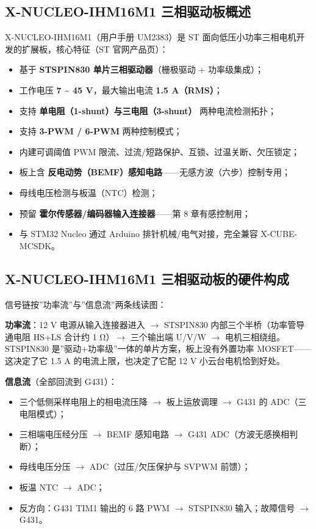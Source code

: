 \documentclass[
  UTF8,
  scheme=plain,
  fontsize=10pt,
  openany
]{ctexbook}
\begin{document}
\subsection{X-NUCLEO-IHM16M1
三相驱动板概述}\label{x-nucleo-ihm16m1-ux4e09ux76f8ux9a71ux52a8ux677fux6982ux8ff0}

X-NUCLEO-IHM16M1（用户手册 UM2383）是 ST
面向低压小功率三相电机开发的扩展板，核心特征（ST 官网产品页）：

\begin{itemize}
\tightlist
\item
  基于 \textbf{STSPIN830 单片三相驱动器}（栅极驱动 + 功率级集成）；
\item
  工作电压 \textbf{7 \textasciitilde{} 45 V}，最大输出电流 \textbf{1.5
  A（RMS）}；
\item
  支持 \textbf{单电阻（1-shunt）与三电阻（3-shunt）} 两种电流检测拓扑；
\item
  支持 \textbf{3-PWM / 6-PWM} 两种控制模式；
\item
  内建可调阈值 PWM 限流、过流/短路保护、互锁、过温关断、欠压锁定；
\item
  板上含
  \textbf{反电动势（BEMF）感知电路}------无感方波（六步）控制专用；
\item
  母线电压检测与板温（NTC）检测；
\item
  预留 \textbf{霍尔传感器/编码器输入连接器}------第 8 章有感控制用；
\item
  与 STM32 Nucleo 通过 Arduino 排针机械/电气对接，完全兼容
  X-CUBE-MCSDK。
\end{itemize}

\subsection{X-NUCLEO-IHM16M1
三相驱动板的硬件构成}\label{x-nucleo-ihm16m1-ux4e09ux76f8ux9a71ux52a8ux677fux7684ux786cux4ef6ux6784ux6210}

信号链按''功率流''与''信息流''两条线读图：

\textbf{功率流}：12 V 电源从输入连接器进入 \(\rightarrow\) STSPIN830
内部三个半桥（功率管导通电阻 HS+LS 合计约 1 Ω）\(\rightarrow\)
三个输出端 U/V/W \(\rightarrow\) 电机三相绕组。STSPIN830
是''驱动+功率级''一体的单片方案，板上没有外置功率 MOSFET------这决定了它
1.5 A 的电流上限，也决定了它配 12 V 小云台电机恰到好处。

\textbf{信息流}（全部回流到 G431）：

\begin{itemize}
\tightlist
\item
  三个低侧采样电阻上的相电流压降 \(\rightarrow\) 板上运放调理
  \(\rightarrow\) G431 的 ADC（三电阻模式）；
\item
  三相端电压经分压 \(\rightarrow\) BEMF 感知电路 \(\rightarrow\) G431
  ADC（方波无感换相判断）；
\item
  母线电压分压 \(\rightarrow\) ADC（过压/欠压保护与 SVPWM 前馈）；
\item
  板温 NTC \(\rightarrow\) ADC；
\item
  反方向：G431 TIM1 输出的 6 路 PWM \(\rightarrow\) STSPIN830
  输入；故障信号 \(\rightarrow\) G431。
\end{itemize}
\end{document}
